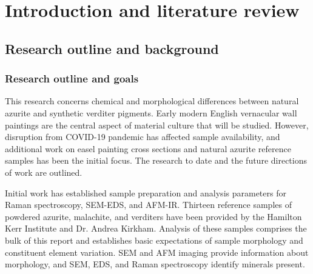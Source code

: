 

\chapter{Introduction and literature review}


\ifpdf
    \graphicspath{{Chapter1/Figs/Raster/}{Chapter1/Figs/PDF/}{Chapter1/Figs/}}
\else
    \graphicspath{{Chapter1/Figs/Vector/}{Chapter1/Figs/}}
\fi


\section[Research outline and background]{Research outline and background} %
\label{section1.1}

\subsection[Research outline and goals]{Research outline and goals}
\label{subsection1.1.1}

This research concerns chemical and morphological differences between natural azurite and synthetic verditer pigments. Early modern English vernacular wall paintings are the central aspect of material culture that will be studied. However, disruption from COVID-19 pandemic has affected sample availability, and additional work on easel painting cross sections and natural azurite reference samples has been the initial focus. The research to date and the future directions of work are outlined.

Initial work has established sample preparation and analysis parameters for Raman spectroscopy, SEM-EDS, and AFM-IR. Thirteen reference samples of powdered azurite, malachite, and verditers have been provided by the Hamilton Kerr Institute and Dr. Andrea Kirkham. Analysis of these samples comprises the bulk of this report and establishes basic expectations of sample morphology and constituent element variation. SEM and AFM imaging provide information about morphology, and SEM, EDS, and Raman spectroscopy identify minerals present.


